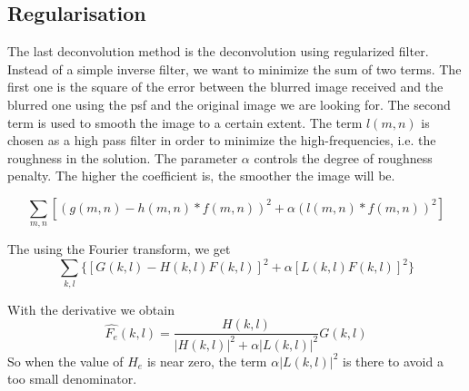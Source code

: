 \subsection{Regularisation}
The last deconvolution method is the deconvolution using regularized filter. 
Instead of a simple inverse filter, we want to minimize the sum of two terms. The first one is the square of the error between the blurred image received and the blurred one using the psf and the original image we are looking for. The second term is used to smooth the image to a certain extent. The term $l(m,n)$ is chosen as a high pass filter in order to minimize the high-frequencies, i.e. the roughness in the solution. The parameter $\alpha$ controls the degree of roughness penalty. The higher the coefficient is, the smoother the image will be. %

\begin{equation}
\sum_{m,n} \left[ (g(m,n) - h(m,n)*f(m,n))^2 + \alpha (l(m,n)*f(m,n))^2 \right]
\end{equation}

The using the Fourier transform, we get
\begin{equation}
\sum_{k,l} \{ [G(k,l) - H(k,l)F(k,l)]^2 + \alpha [L(k,l)F(k,l)]^2\}
\end{equation}

With the derivative we obtain
\begin{equation}
\hat{F_e}(k,l) = \frac{H(k,l)}{|H(k,l)|^2 + \alpha |L(k,l)|^2} G(k,l)
\end{equation}
So when the value of $H_e$ is near zero, the term $\alpha |L(k,l)|^2$ is there to avoid a too small denominator. 

